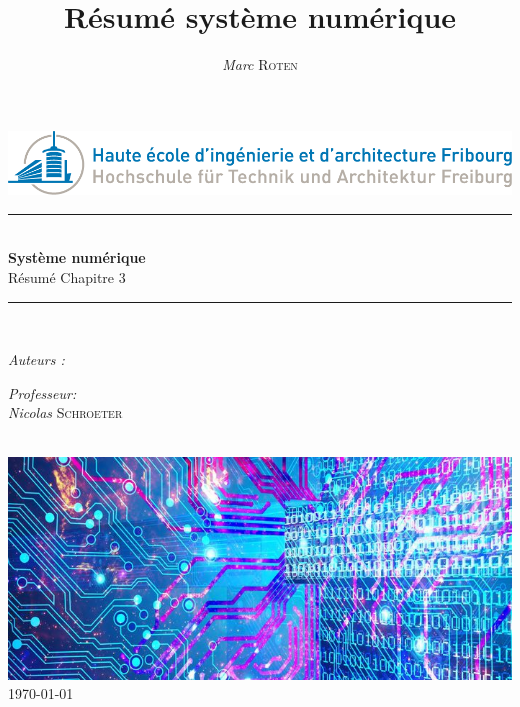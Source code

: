 

\title{Résumé système numérique} 
\author{\textsl{Marc} \textsc{Roten}}
\date{}


    \begin{titlepage}
        \begin{center}
            \includegraphics[scale=.4]{Img/heia-fr-logo.png}\\[1.3cm]
            
            \rule{\linewidth}{0.3mm} \\[0.3cm]
            {\huge \bfseries Système numérique\\[0.5cm]} 
            {\Large  Résumé Chapitre 3 }
            \rule{\linewidth}{0.3mm} \\[0.8cm]
            \noindent
            \begin{minipage}[t]{0.4\textwidth}
                \begin{flushleft} \large
                    \emph{Auteurs :}\\
                    \theauthor
                \end{flushleft}
            \end{minipage}
            \begin{minipage}[t]{0.4\textwidth} 
                \begin{flushright} \large
                    \emph{Professeur:}\\
                    \textsl{Nicolas} \textsc{ Schroeter}\\ 
                \end{flushright} 
                \vfill
            \end{minipage}\\[1.3cm]
            \includegraphics[scale=0.7]{Img/title.jpg}\\[1.5cm]
            \vspace*{1\baselineskip}
            \today \\[0.7cm]
        \end{center}
    \end{titlepage}
    \tableofcontents
    \clearpage

